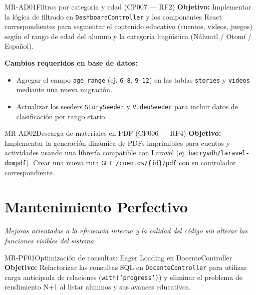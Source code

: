 \begin{RequisitoFuncional}{MR-AD01}{Filtros por categoría y edad (CP007 --- RF2)}
    \textbf{Objetivo:} Implementar la lógica de filtrado en \texttt{DashboardController}
    y los componentes React correspondientes para segmentar el contenido educativo
    (cuentos, videos, juegos) según el rango de edad del alumno y la categoría
    lingüística (Náhuatl / Otomí / Español).

    \textbf{Cambios requeridos en base de datos:}
    \begin{itemize}
        \item Agregar el campo \texttt{age\_range} (ej. \texttt{6-8}, \texttt{9-12})
              en las tablas \texttt{stories} y \texttt{videos} mediante una nueva
              migración.
        \item Actualizar los seeders \texttt{StorySeeder} y \texttt{VideoSeeder} para
              incluir datos de clasificación por rango etario.
    \end{itemize}
\end{RequisitoFuncional}

\begin{RequisitoFuncional}{MR-AD02}{Descarga de materiales en PDF (CP006 --- RF4)}
    \textbf{Objetivo:} Implementar la generación dinámica de PDFs imprimibles para
    cuentos y actividades usando una librería compatible con Laravel (ej.
    \texttt{barryvdh/laravel-dompdf}). Crear una nueva ruta
    \texttt{GET /cuentos/\{id\}/pdf} con su controlador correspondiente.
\end{RequisitoFuncional}

\newpage
\section{Mantenimiento Perfectivo}

\textit{Mejoras orientadas a la eficiencia interna y la calidad del código sin
alterar las funciones visibles del sistema.}

\begin{RequisitoFuncional}{MR-PF01}{Optimización de consultas: Eager Loading en DocenteController}
    \textbf{Objetivo:} Refactorizar las consultas SQL en \texttt{DocenteController}
    para utilizar carga anticipada de relaciones (\texttt{with('progress')}) y
    eliminar el problema de rendimiento N+1 al listar alumnos y sus avances educativos.
\end{RequisitoFuncional}

